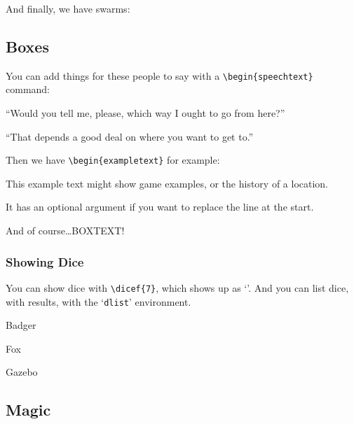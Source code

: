 \documentclass[a4paper,openany]{book}
\begin{document}
\begin{multicols}{2}
\togglefalse{genExamples}


\humansoldier

And finally, we have swarms:


\subsection{Boxes}

You can add things for these people to say with a \verb"\begin{speechtext}" command:

\begin{speechtext}

  ``Would you tell me, please, which way I ought to go from here?''

  ``That depends a good deal on where you want to get to.''

\end{speechtext}

Then we have \verb"\begin{exampletext}" for example:

\begin{exampletext}
  This example text might show game examples, or the history of a location.

  It has an optional argument if you want to replace the line at the start.

\end{exampletext}

\begin{boxtext}
  And of course\ldots BOXTEXT!

\end{boxtext}

\subsubsection{Showing Dice}

You can show dice with \verb"\dicef{7}", which shows up as `'.
And you can list dice, with results, with the `\texttt{dlist}' environment.

\begin{dlist}
  \item Badger
  \item Fox
  \item Gazebo
\end{dlist}

\subsection{Magic}


\end{multicols}
\end{document}
